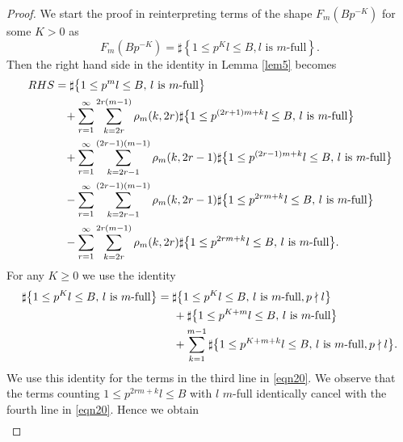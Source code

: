 \documentclass[JEP,XML,SOM,Unicode,published]{cedram}
\theoremstyle{definition}
\numberwithin{theorem}{section}
\begin{document}
\begin{proof}
We start the proof in reinterpreting terms of the shape $F_m\left(Bp^{-K}\right)$ for some $K>0$ as
\[
F_m\left(Bp^{-K}\right)= \sharp\left\{1\leq p^Kl\leq B, l \mbox{ is $m$-full}\right\}.
\]
Then the right hand side in the identity in Lemma \ref{lem5} becomes
\begin{equation}\label{eqn20}
\begin{split}
RHS &=\sharp\bigl\{1\leq p^ml\leq B,\, l \mbox{ is $m$-full}\bigr\} \\
&\hspace*{3mm}+\sum_{r=1}^{\infty} \sum_{k=2r}^{2r(m-1)}\rho_m(k,2r)\sharp\bigl\{1\leq p^{(2r+1)m+k}l\leq B,\, l \mbox{ is $m$-full}\bigr\}\\
&\hspace*{3mm}+ \sum_{r=1}^\infty\sum_{k=2r-1}^{(2r-1)(m-1)}\rho_m(k,2r-1)\sharp\bigl\{1\leq p^{(2r-1)m+k}l\leq B,\, l \mbox{ is $m$-full}\bigr\}\\
&\hspace*{3mm}-\sum_{r=1}^\infty \sum_{k=2r-1}^{(2r-1)(m-1)}\rho_m(k,2r-1)\sharp\bigl\{1\leq p^{2rm+k}l\leq B,\, l \mbox{ is $m$-full}\bigr\}\\
&\hspace*{3mm}-\sum_{r=1}^\infty\sum_{k=2r}^{2r(m-1)}\rho_m(k,2r)\sharp\bigl\{1\leq p^{2rm+k}l\leq B,\, l \mbox{ is $m$-full}\bigr\}.
\end{split}
\end{equation}
For any $K\geq 0$ we use the identity
\begin{equation}\label{eqn20b}
\begin{split}
\sharp\bigl\{1\leq p^{K}l\leq B,\, l \mbox{ is $m$-full}\bigr\} &= \sharp\bigl\{1\leq p^{K}l\leq B,\, l \mbox{ is $m$-full}, p\nmid l\bigr\}\\
&\hspace*{5mm}+ \sharp\bigl\{1\leq p^{K+m}l\leq B,\, l \mbox{ is $m$-full}\bigr\}\\
&\hspace*{5mm}+\sum_{k=1}^{m-1}\sharp\bigl\{1\leq p^{K+m+k}l\leq B,\, l \mbox{ is $m$-full}, p\nmid l\bigr\}.
\end{split}
\end{equation}
We use this identity for the terms in the third line in \eqref{eqn20}. We observe that the terms counting $1\leq p^{2rm+k}l\leq B$ with $l$ $m$-full identically cancel with the fourth line in \eqref{eqn20}. Hence we obtain
\begin{equation*}
\begin{split}

\end{split}
\end{equation*}
\end{proof}
\end{document}
